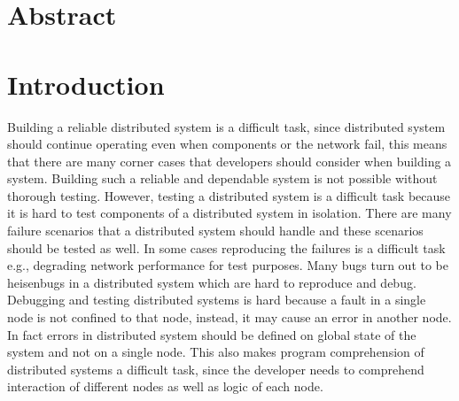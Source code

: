 \section{Abstract}
\section{Introduction}

Building a reliable distributed system is a difficult task, since distributed system should continue operating even when components or the network fail, this means that there are many corner cases that developers should consider when building a system. Building such 
a reliable and dependable system is not possible without thorough testing. However, testing a distributed system is a difficult task because it is hard to test components of a distributed system in isolation. There are many 
failure scenarios that a distributed system should handle and these scenarios should be tested as well. In some cases reproducing the failures is a difficult task e.g., degrading network performance for test purposes. Many bugs turn out to be heisenbugs in a distributed 
system which are hard to reproduce and debug. Debugging and testing distributed systems is hard because a fault in a single node is not confined to that node, instead, it may cause an error in another node. In fact errors in distributed system should be defined on global state of the system and not on a single node. This also makes program comprehension of distributed systems a difficult task, since the developer needs to comprehend interaction of different nodes as well as logic of each node.

